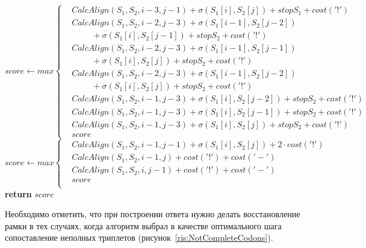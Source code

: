 \begin{algorithm}
	\begin{algorithmic}
		\State $score \gets max\left\{
		\begin{aligned}	
			& CalcAlign(S_1, S_2, i-3, j-1) + \sigma(S_1[i], S_2[j]) + stopS_1 + cost('!')\\
			& CalcAlign(S_1, S_2, i-2, j-3) + \sigma(S_1[i-1], S_2[j-2])\\ 
			& \hspace{1cm} + \sigma(S_1[i], S_2[j-1]) + stopS_2 + cost('!')\\
			& CalcAlign(S_1, S_2, i-2, j-3) + \sigma(S_1[i-1], S_2[j-1])\\ 
			& \hspace{1cm} + \sigma(S_1[i], S_2[j]) + stopS_2 + cost('!')\\
			& CalcAlign(S_1, S_2, i-2, j-3) + \sigma(S_1[i-1], S_2[j-2])\\ 
			& \hspace{1cm} + \sigma(S_1[i], S_2[j]) + stopS_2 + cost('!')\\
			& CalcAlign(S_1, S_2, i-1, j-3) + \sigma(S_1[i], S_2[j-2]) + stopS_2 + cost('!')\\
			& CalcAlign(S_1, S_2, i-1, j-3) + \sigma(S_1[i], S_2[j-1]) + stopS_2 + cost('!')\\
			& CalcAlign(S_1, S_2, i-1, j-3) + \sigma(S_1[i], S_2[j]) + stopS_2 + cost('!')\\
			& score
		\end{aligned}
		\right.$
		\Statex {}
		\State $score \gets max\left\{
		\begin{aligned}
			& CalcAlign(S_1, S_2, i-1, j-1) + \sigma(S_1[i], S_2[j]) + 2\cdot cost('!')\\
			& CalcAlign(S_1, S_2, i-1, j) + cost('!') + cost('-')\\
			& CalcAlign(S_1, S_2, i, j-1) + cost('!') + cost('-')\\
			& score\\
		\end{aligned}
		\right.$
		\State \textbf{return} $score$
		\EndProcedure
	\end{algorithmic}
\end{algorithm}

\indent Необходимо отметить, что при построении ответа нужно делать восстановление рамки в тех случаях, когда алгоритм выбрал в качестве оптимального шага сопоставление неполных триплетов (рисунок~\ref{ris:NotCompleteCodons}).

